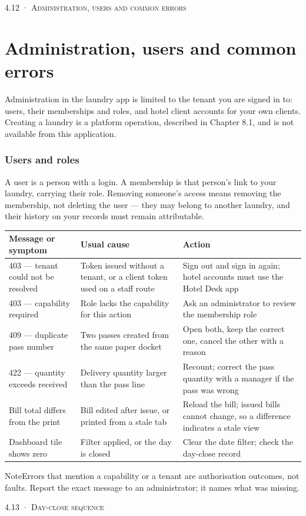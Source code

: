 \documentclass[11pt,a4paper,oneside]{book}
\begin{document}
\textsc{\small\color{crimson}4.12 · Administration, users and common errors}\par\medskip
\section*{Administration, users and common errors}
Administration in the laundry app is limited to the tenant you are signed in to: users, their memberships and roles, and hotel client accounts for your own clients. Creating a laundry is a platform operation, described in Chapter 8.1, and is not available from this application.

\subsubsection*{Users and roles}
A user is a person with a login. A membership is that person's link to your laundry, carrying their role. Removing someone's access means removing the membership, not deleting the user — they may belong to another laundry, and their history on your records must remain attributable.

\begin{center}\small
\begin{tabularx}{\linewidth}{|X|X|X|}
\hline
\rowcolor{lightgrey}
\textbf{Message or symptom} & \textbf{Usual cause} & \textbf{Action} \\ \hline
403 — tenant could not be resolved & Token issued without a tenant, or a client token used on a staff route & Sign out and sign in again; hotel accounts must use the Hotel Desk app \\ \hline
403 — capability required & Role lacks the capability for this action & Ask an administrator to review the membership role \\ \hline
409 — duplicate pass number & Two passes created from the same paper docket & Open both, keep the correct one, cancel the other with a reason \\ \hline
422 — quantity exceeds received & Delivery quantity larger than the pass line & Recount; correct the pass quantity with a manager if the pass was wrong \\ \hline
Bill total differs from the print & Bill edited after issue, or printed from a stale tab & Reload the bill; issued bills cannot change, so a difference indicates a stale view \\ \hline
Dashboard tile shows zero & Filter applied, or the day is closed & Clear the date filter; check the day-close record \\ \hline
\end{tabularx}
\end{center}
\begin{notebox}NoteErrors that mention a capability or a tenant are authorisation outcomes, not faults. Report the exact message to an administrator; it names what was missing.\end{notebox}
\textsc{\small\color{crimson}4.13 · Day-close sequence}\par\medskip
\end{document}
